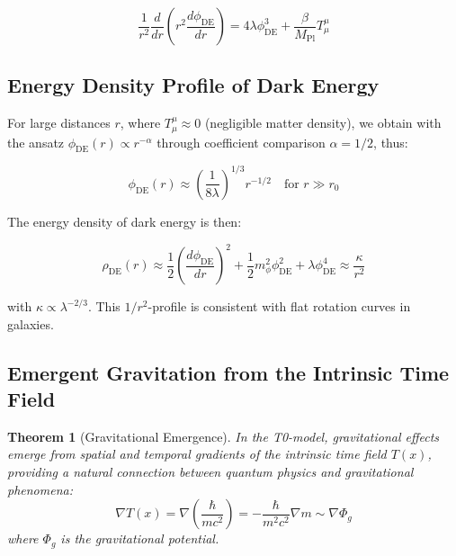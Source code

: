 \documentclass[a4paper,12pt]{article}
\newtheorem{theorem}{Theorem}[section]
\theoremstyle{definition}
\theoremstyle{remark}
\newcommand{\Tfield}{T(x)} %
\begin{document}
	\begin{equation}
		\frac{1}{r^2}\frac{d}{dr}\left(r^2\frac{d\phi_{\text{DE}}}{dr}\right) = 4\lambda\phi_{\text{DE}}^3 + \frac{\beta}{M_{\text{Pl}}}T^{\mu}_{\mu}
	\end{equation}
	
	\subsection{Energy Density Profile of Dark Energy}
	
	For large distances \(r\), where \(T^{\mu}_{\mu} \approx 0\) (negligible matter density), we obtain with the ansatz \(\phi_{\text{DE}}(r) \propto r^{-\alpha}\) through coefficient comparison \(\alpha = 1/2\), thus:
	
	\begin{equation}
		\phi_{\text{DE}}(r) \approx \left(\frac{1}{8\lambda}\right)^{1/3} r^{-1/2} \quad \text{for } r \gg r_0
	\end{equation}
	
	The energy density of dark energy is then:
	
	\begin{equation}
		\rho_{\text{DE}}(r) \approx \frac{1}{2}\left(\frac{d\phi_{\text{DE}}}{dr}\right)^2 + \frac{1}{2}m_{\phi}^2\phi_{\text{DE}}^2 + \lambda\phi_{\text{DE}}^4 \approx \frac{\kappa}{r^2}
	\end{equation}
	
	with \(\kappa \propto \lambda^{-2/3}\). This \(1/r^2\)-profile is consistent with flat rotation curves in galaxies.
	
	\subsection{Emergent Gravitation from the Intrinsic Time Field}
	
	\begin{theorem}[Gravitational Emergence]
		In the T0-model, gravitational effects emerge from spatial and temporal gradients of the intrinsic time field \(\Tfield\), providing a natural connection between quantum physics and gravitational phenomena:
		\begin{equation}
			\nabla \Tfield = \nabla \left(\frac{\hbar}{mc^2}\right) = -\frac{\hbar}{m^2c^2}\nabla m \sim \nabla \Phi_g
		\end{equation}
		where \(\Phi_g\) is the gravitational potential.
	\end{theorem}
	
\end{document}
